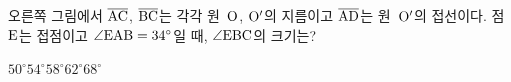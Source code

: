 \noindent\begin{minipage}[t]{0.58\linewidth}\vspace{0pt}\raggedright 오른쪽 그림에서 $\overline{\mathrm{AC}}$, $\overline{\mathrm{BC}}$는 각각 원~$\mathrm{O}$, $\mathrm{O'}$의 지름이고 $\overline{\mathrm{AD}}$는 원~$\mathrm{O'}$의 접선이다. 점~$\mathrm{E}$는 접점이고 $\angle\mathrm{EAB}=34^\circ$일 때, $\angle\mathrm{EBC}$의 크기는?\end{minipage}\hfill\begin{minipage}[t]{0.4\linewidth}\vspace{0pt}\centering \resizebox{\ifdim\width>\linewidth\linewidth\else\width\fi}{!}{}\end{minipage}\par
\begin{choices32}{$50^\circ$}{$54^\circ$}{$58^\circ$}{$62^\circ$}{$68^\circ$}\end{choices32}
